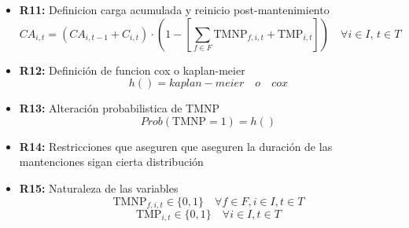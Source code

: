 \documentclass{article}
\begin{document}
\begin{itemize}
    \item \textbf{R11:} Definicion carga acumulada y reinicio post-mantenimiento
    \[
    CA_{i,t} = (CA_{i,t-1} + C_{i,t}) \cdot (1 - [\sum_{f \in F}\text{TMNP}_{f, i, t} + \text{TMP}_{i,t}]) \quad \forall i \in I, \, t \in T
    \]

    \item \textbf{R12:} Definición de funcion cox o kaplan-meier 
    \[
    h() = kaplan-meier \quad o \quad cox
    \]
    \item \textbf{R13:} Alteración probabilistica de TMNP
    \[
    Prob(\text{TMNP} = 1) = h()
    \]

    \item \textbf{R14:} Restricciones que aseguren que aseguren la duración de las mantenciones sigan cierta distribución

    \item \textbf{R15:} Naturaleza de las variables
    \[
    \text{TMNP}_{f,i,t} \in \{0,1\} \quad \forall f \in F, i \in I, t \in T
    \]
    \[
    \text{TMP}_{i,t} \in \{0,1\} \quad \forall i \in I, t \in T
    \]
    
\end{itemize}
\end{document}
